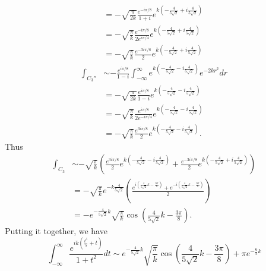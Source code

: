 \documentclass{article}
\begin{document}
\begin{itemize}
\begin{itemize}
\begin{align*}
            &= -\sqrt{\frac{\pi}{2k}}\frac{e^{-i\pi/8}}{1+i}e^{k\left(-\frac{4}{5\sqrt{2}} + i\frac{4}{5\sqrt{2}}\right)}\\
            &= -\sqrt{\frac{\pi}{k}}\frac{e^{-i\pi/8}}{2e^{i\pi/4}}e^{k\left(-\frac{4}{5\sqrt{2}} + i\frac{4}{5\sqrt{2}}\right)}\\
            &= -\sqrt{\frac{\pi}{k}}\frac{e^{-3i\pi/8}}{2}e^{k\left(-\frac{4}{5\sqrt{2}} + i\frac{4}{5\sqrt{2}}\right)}\\
            \int_{C_3''} &\sim -\frac{e^{i\pi/8}}{1 - i}\int_{-\infty}^{\infty}e^{k\left(-\frac{4}{5\sqrt{2}} - i\frac{4}{5\sqrt{2}}\right)}e^{-2kr^2}dr\\
            &= -\sqrt{\frac{\pi}{2k}}\frac{e^{i\pi/8}}{1 - i}e^{k\left(-\frac{4}{5\sqrt{2}} - i\frac{4}{5\sqrt{2}}\right)}\\
            &= -\sqrt{\frac{\pi}{k}}\frac{e^{i\pi/8}}{2e^{-i\pi/4}}e^{k\left(-\frac{4}{5\sqrt{2}} - i\frac{4}{5\sqrt{2}}\right)}\\
            &= -\sqrt{\frac{\pi}{k}}\frac{e^{3i\pi/8}}{2}e^{k\left(-\frac{4}{5\sqrt{2}} - i\frac{4}{5\sqrt{2}}\right)}.
        \end{align*}
        Thus
        \begin{align*}
            \int_{C_3} &\sim -\sqrt{\frac{\pi}{k}}\left(\frac{e^{3i\pi/8}}{2}e^{k\left(-\frac{4}{5\sqrt{2}} - i\frac{4}{5\sqrt{2}}\right)} + \frac{e^{-3i\pi/8}}{2}e^{k\left(-\frac{4}{5\sqrt{2}} + i\frac{4}{5\sqrt{2}}\right)}\right)\\
            &= -\sqrt{\frac{\pi}{k}}e^{-k\frac{4}{5\sqrt{2}}}\left(\frac{e^{i\left(\frac{4}{5\sqrt{2}}k - \frac{3\pi}{8}\right)} + e^{-i\left(\frac{4}{5\sqrt{2}}k - \frac{3\pi}{8}\right)}}{2}\right)\\
            &= -e^{-\frac{4}{5\sqrt{2}}k}\sqrt{\frac{\pi}{k}}\cos\left(\frac{4}{5\sqrt{2}}k - \frac{3\pi}{8}\right).
        \end{align*}
        Putting it together, we have
        \[\int_{-\infty}^{\infty} \frac{e^{ik\left(\frac{t^5}{5} + t\right)}}{1 + t^2}dt \sim e^{-\frac{4}{5\sqrt{2}}k}\sqrt{\frac{\pi}{k}}\cos\left(\frac{4}{5\sqrt{2}}k - \frac{3\pi}{8}\right) + \pi e^{-\frac{6}{5}k}\]
        
        
    \end{itemize}


\end{itemize}
\end{document}
